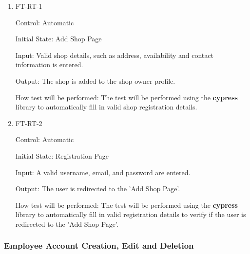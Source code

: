 \documentclass[12pt, titlepage]{article}
\begin{document}
		

\begin{enumerate}

\item{FT-RT-1\\}

Control: Automatic
					
Initial State: Add Shop Page
					
Input: Valid shop details, such as address, availability and contact information is entered.
					
Output: The shop is added to the shop owner profile.

How test will be performed: The test will be performed using the \textbf{cypress} library to automatically fill in valid shop registration details.

\item{FT-RT-2\\}

Control: Automatic
					
Initial State: Registration Page
					
Input: A valid username, email, and password are entered.
					
Output: The user is redirected to the 'Add Shop Page'.
					
How test will be performed: The test will be performed using the \textbf{cypress} library to automatically fill in valid registration details to verify if the user is redirected to the 'Add Shop Page'.

\end{enumerate}

\subsubsection{Employee Account Creation, Edit and Deletion}
\end{document}
